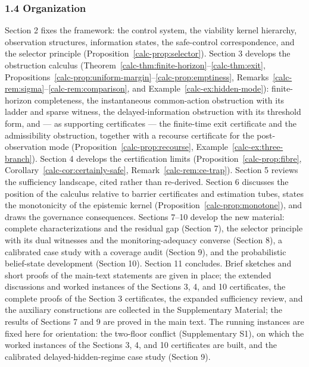 \documentclass[10pt,twocolumn]{article}
\theoremstyle{definition}
\begin{document}
\subsubsection{1.4 Organization}\label{calc-organization}

Section 2 fixes the framework: the control system, the viability kernel
hierarchy, observation structures, information states, the safe-control
correspondence, and the selector principle (Proposition~\ref{calc-prop:selector}). Section 3 develops the obstruction calculus (Theorem~\ref{calc-thm:finite-horizon}--\ref{calc-thm:exit}, Propositions~\ref{calc-prop:uniform-margin}--\ref{calc-prop:emptiness}, Remarks~\ref{calc-rem:sigma}--\ref{calc-rem:comparison}, and Example~\ref{calc-ex:hidden-mode}): finite-horizon completeness, the instantaneous common-action obstruction with its ladder and sparse witness, the delayed-information obstruction with its threshold form, and --- as supporting certificates --- the finite-time exit certificate and the admissibility obstruction, together with a recourse certificate for the post-observation mode (Proposition~\ref{calc-prop:recourse}, Example~\ref{calc-ex:three-branch}). Section 4 develops the certification limits
(Proposition~\ref{calc-prop:fibre}, Corollary~\ref{calc-cor:certainly-safe}, Remark~\ref{calc-rem:ce-trap}). Section 5 reviews the sufficiency landscape, cited rather than re-derived. Section
6 discusses the position of the calculus relative to barrier
certificates and estimation tubes, states the monotonicity of the
epistemic kernel (Proposition~\ref{calc-prop:monotone}), and draws the governance
consequences. Sections 7--10 develop the new material: complete characterizations and the residual gap (Section 7), the selector principle with its dual witnesses and the monitoring-adequacy converse (Section 8), a calibrated case study with a coverage audit (Section 9), and the probabilistic belief-state development (Section 10). Section 11 concludes. Brief sketches and short proofs of the main-text statements are given in place; the extended discussions and worked instances of the Sections 3, 4, and 10 certificates, the complete proofs of the Section 3 certificates, the expanded sufficiency review, and the auxiliary constructions are collected in the Supplementary Material; the results of Sections 7 and 9 are proved in the main text. The running
instances are fixed here for orientation: the two-floor conflict
(Supplementary S1), on which the worked instances of the Sections 3, 4,
and 10 certificates are built, and the calibrated delayed-hidden-regime
case study (Section 9).
\end{document}

